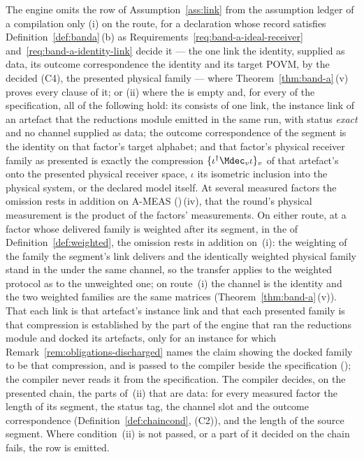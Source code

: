 \begin{requirement}\label{req:link-row-provenance}
The engine omits the row of Assumption~\ref{ass:link} from the assumption
ledger of a compilation only
(i) on the  route, for a declaration whose record satisfies
Definition~\ref{def:banda}\,(b) as Requirements~\ref{req:band-a-ideal-receiver}
and~\ref{req:band-a-identity-link} decide it --- the one link the identity,
supplied as data, its outcome correspondence the identity and its target
POVM, by the decided (C4), the presented physical family --- where
Theorem~\ref{thm:band-a}\,(v) proves every clause of it; or
(ii) where the  is empty and, for every
 of the specification, all of the following hold: its
 consists of one link, the instance link of an
artefact that the reductions module emitted in the same run, with status
\emph{exact} and no channel supplied as data; the outcome correspondence of
the segment is the identity on that factor's target alphabet; and that
factor's physical receiver family as presented is exactly the compression
$\{\iota^{\dagger}\Mdec_v\iota\}_v$ of that artefact's 
onto the presented physical receiver space, $\iota$ its isometric inclusion
into the physical system, or the declared model itself. At several measured
factors the omission rests in addition on A-MEAS
()\,(iv), that the round's physical measurement is
the product of the factors' measurements. On either route, at a factor
whose delivered family is weighted after its segment, in the
 of Definition~\ref{def:weighted}, the omission
rests in addition on \,(i): the weighting of the
family the segment's link delivers and the identically weighted physical
family stand in the  under the same channel, so the
transfer applies to the weighted protocol as to the unweighted one; on
route~(i) the channel is the identity and the two weighted families are the
same matrices (Theorem~\ref{thm:band-a}\,(v)).
That each link is that artefact's instance link and that each presented
family is that compression is established by the part of the engine that ran
the reductions module and docked its artefacts, only for an instance for which
Remark~\ref{rem:obligations-discharged} names the claim showing the docked
family to be that compression, and is passed to the compiler
beside the specification (); the compiler never reads
it from the specification. The compiler decides, on the presented chain, the
parts of~(ii) that are data: for every measured factor the length of its
segment, the status tag, the channel slot and the outcome correspondence
(Definition~\ref{def:chaincond}, (C2)), and the length of the source segment.
Where condition~(ii) is not passed, or a part of it decided on the chain
fails, the row is emitted.
\end{requirement}
